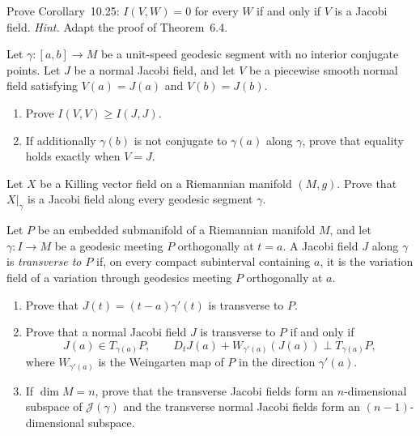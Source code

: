 \begin{exercise}
\label{prob:jacobi-field-index-form}

Prove Corollary~10.25: $I(V,W)=0$ for every $W$ if and only if $V$ is a
Jacobi field. \emph{Hint.} Adapt the proof of Theorem~6.4.
\end{exercise}

\begin{exercise}
\label{prob:normal-jacobi-minimizes-index}

Let $\gamma:[a,b]\to M$ be a unit-speed geodesic segment with no interior
conjugate points. Let $J$ be a normal Jacobi field, and let $V$ be a piecewise
smooth normal field satisfying $V(a)=J(a)$ and $V(b)=J(b)$.
\begin{enumerate}
\item[(a)] Prove $I(V,V)\geq I(J,J)$.
\item[(b)] If additionally $\gamma(b)$ is not conjugate to $\gamma(a)$ along
$\gamma$, prove that equality holds exactly when $V=J$.
\end{enumerate}
\end{exercise}

\begin{exercise}
\label{prob:killing-vector-jacobi-field}

Let $X$ be a Killing vector field on a Riemannian manifold $(M,g)$. Prove that
$X|_\gamma$ is a Jacobi field along every geodesic segment $\gamma$.
\end{exercise}

\begin{exercise}
\label{prob:transverse-jacobi-field}

Let $P$ be an embedded submanifold of a Riemannian manifold $M$, and let
$\gamma:I\to M$ be a geodesic meeting $P$ orthogonally at $t=a$. A Jacobi
field $J$ along $\gamma$ is \emph{transverse to $P$} if, on every compact
subinterval containing $a$, it is the variation field of a variation through
geodesics meeting $P$ orthogonally at $a$.
\begin{enumerate}
\item[(a)] Prove that $J(t)=(t-a)\gamma'(t)$ is transverse to $P$.
\item[(b)] Prove that a normal Jacobi field $J$ is transverse to $P$ if and
only if
\[
J(a)\in T_{\gamma(a)}P,
\qquad
D_tJ(a)+W_{\gamma'(a)}(J(a))
\perp T_{\gamma(a)}P,
\]
where $W_{\gamma'(a)}$ is the Weingarten map of $P$ in the direction
$\gamma'(a)$.
\item[(c)] If $\dim M=n$, prove that the transverse Jacobi fields form an
$n$-dimensional subspace of $\mathcal J(\gamma)$ and the transverse normal
Jacobi fields form an $(n-1)$-dimensional subspace.
\end{enumerate}
\end{exercise}

